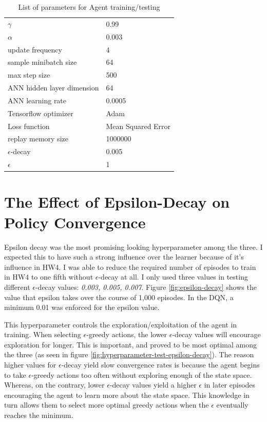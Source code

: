 \documentclass[conference]{IEEEtran}
\begin{document}
\begin{table}[]
    \label{table:1}
    \caption{List of parameters for Agent training/testing}
    \hline
    \begin{tabular}{ll}
    $\gamma$ & 0.99 \\
    $\alpha$ & 0.003 \\
    update frequency & 4 \\
    sample minibatch size & 64 \\
    max step size & 500 \\
    ANN hidden layer dimension & 64 \\
    ANN learning rate & 0.0005 \\
    Tensorflow optimizer & Adam \\
    Loss function & Mean Squared Error \\
    replay memory size & 1000000 \\
    $\epsilon$-decay & 0.005 \\
    $\epsilon$ & 1
    \end{tabular}
    \hline
\end{table}

\section{The Effect of Epsilon-Decay on Policy Convergence}
Epsilon decay was the most promising looking hyperparameter among the three. I expected this to have such a strong influence over the learner because of it's influence in HW4. I was able to reduce the required number of episodes to train in HW4 to one fifth without $\epsilon$-decay at all. I only used three values in testing different $\epsilon$-decay values: \textit{0.003, 0.005, 0.007}. Figure \ref{fig:epsilon-decay} shows the value that epsilon takes over the course of 1,000 episodes. In the DQN, a minimum 0.01 was enforced for the epsilon value.

This hyperparameter controls the exploration/exploitation of the agent in training. When selecting $\epsilon$-greedy actions, the lower $\epsilon$-decay values will encourage exploration for longer. This is important, and proved to be most optimal among the three (as seen in figure \ref{fig:hyperparameter-test-epsilon-decay}). The reason higher values for $\epsilon$-decay yield slow convergence rates is because the agent begins to take $\epsilon$-greedy actions too often without exploring enough of the state space. Whereas, on the contrary, lower $\epsilon$-decay values yield a higher $\epsilon$ in later episodes encouraging the agent to learn more about the state space. This knowledge in turn allows them to select more optimal greedy actions when the $\epsilon$ eventually reaches the minimum.
\end{document}
